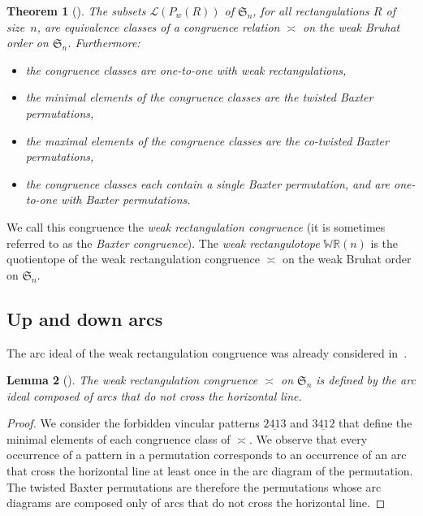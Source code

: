\documentclass{amsart}
\newtheorem{theorem}{Theorem}%
\newtheorem{lemma}[theorem]{Lemma}
\theoremstyle{definition}
\newcommand{\f}[1]{\mathfrak{#1}} %
\newcommand{\darkblue}{\color{darkblue}} %
\newcommand{\defn}[1]{\textsl{\darkblue #1}} %
\newcommand{\polytope}[1]{\mathds{#1}} %
\newcommand{\WRP}{\polytope{WR}} %
\newcommand{\weakeq}{\asymp}
\begin{document}
\begin{theorem}[\cite{MR2871762}]
  The subsets $\mathcal{L}(P_w(R))$ of $\f{S}_n$, for all rectangulations $R$ of size~$n$, 
  are equivalence classes of a congruence relation $\weakeq$ on the weak Bruhat order on $\f{S}_n$.
  Furthermore:
  \begin{itemize}
  \item the congruence classes are one-to-one with weak rectangulations,  
  \item the minimal elements of the congruence classes are the twisted Baxter permutations,
  \item the maximal elements of the congruence classes are the co-twisted Baxter permutations,
  \item the congruence classes each contain a single Baxter permutation, and are one-to-one with Baxter permutations.
  \end{itemize}
\end{theorem}

We call this congruence the \defn{weak rectangulation congruence} (it is sometimes referred to as the \defn{Baxter congruence}).
The \defn{weak rectangulotope} $\WRP(n)$ is the quotientope of the weak rectangulation congruence $
\weakeq$ on the weak Bruhat order on $\f{S}_n$.


\subsection{Up and down arcs}
\label{subsec:upDownArcs}

The arc ideal of the weak rectangulation congruence was already considered in~\cite[Exm.~4.10]{Reading-arcDiagrams}.

\begin{lemma}[{\cite[Exm.~4.10]{Reading-arcDiagrams}}]
The weak rectangulation congruence $\weakeq$ on $\f{S}_n$ is defined by the arc ideal composed of arcs that do not cross the horizontal line.
\end{lemma}
\begin{proof}
  We consider the forbidden vincular patterns $2\underline{41}3$ and $3\underline{41}2$ that define the minimal elements of each congruence class of $\weakeq$.
  We observe that every occurrence of a pattern in a permutation corresponds to an occurrence of an arc that cross the horizontal line at least once in the arc diagram of the permutation.
  The twisted Baxter permutations are therefore the permutations whose arc diagrams are composed only of arcs that do not cross the horizontal line.
\end{proof}
\end{document}
